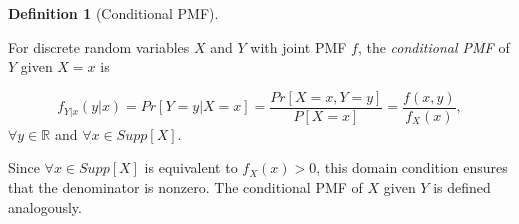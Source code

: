 \documentclass[
]{article}
\theoremstyle{definition}
\newtheorem{definition}{Definition}[section]
\theoremstyle{definition}
\theoremstyle{definition}
\theoremstyle{remark}
\begin{document}
\begin{definition}[Conditional PMF]
\protect\hypertarget{def:unlabeled-div-44}{}\label{def:unlabeled-div-44}

For discrete random variables \(X\) and \(Y\) with joint PMF \(f\), the \emph{conditional PMF} of \(Y\) given \(X = x\) is

\[f_{Y|x}(y|x) = Pr[Y = y | X = x] = \frac{Pr[X = x, Y = y]}{P[X = x]} = \frac{f(x,y)}{f_X(x)},\]
\(\forall y \in \mathbb{R}\) and \(\forall x \in Supp[X]\).

Since \(\forall x \in Supp[X]\) is equivalent to \(f_X(x) > 0\), this domain condition ensures that the denominator is nonzero. The conditional PMF of \(X\) given \(Y\) is defined analogously.

\end{definition}
\end{document}
